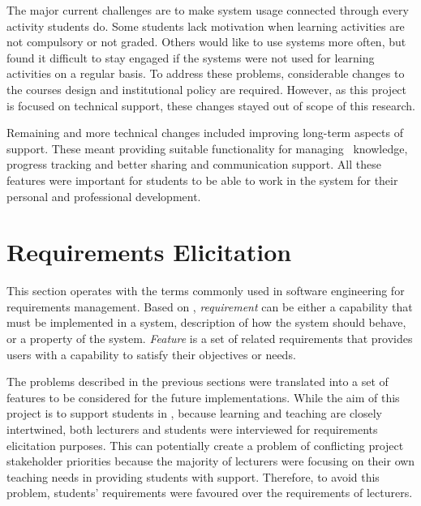 The major current challenges are to make system usage
connected through every activity students do. Some students lack motivation
when learning activities are not compulsory or not graded. Others would like to
use systems more often, but found it difficult to stay engaged if the systems
were not used for learning activities on a regular basis. To address these
problems, considerable changes to the courses design and institutional policy
are required. However, as this project is focused on technical support, these
changes stayed out of scope of this research.

Remaining and more technical changes included improving long-term aspects of
\LLLs support. These meant providing suitable functionality for managing
\ep~knowledge, progress tracking and better sharing and communication support.
All these features were important for students to be able to work in the system
for their personal and professional development. 

\section{Requirements Elicitation}
\label{sec:elicit}
This section operates with the terms commonly used in software engineering for
requirements management. Based on \citet{Wiegers2003}, \textit{requirement} can
be either a capability that must be implemented in a system, description of how
the system should behave, or a property of the system. \textit{Feature} is a set
of related requirements that provides users with a capability to satisfy their
objectives or needs.

The problems described in the previous sections were translated into a set of
features to be considered for the future implementations. While the aim of this
project is to support students in \LLLsn, because learning and teaching are
closely intertwined, both lecturers and students were interviewed for
requirements elicitation purposes. This can potentially create a problem of
conflicting project stakeholder priorities \citep{Leffingwell2011} because the
majority of lecturers were focusing on their own teaching needs in providing
students with \LLLs support. Therefore, to avoid this problem, students'
requirements were favoured over the requirements of lecturers. 


